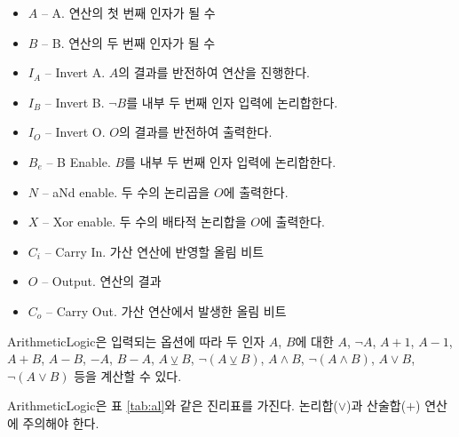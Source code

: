 \documentclass{article}
\renewcommand{\tablename}{표}
\begin{document}
\begin{itemize}
    \item $A$ -- A. 연산의 첫 번째 인자가 될 수
    \item $B$ -- B. 연산의 두 번째 인자가 될 수
    \item $I_A$ -- Invert A. $A$의 결과를 반전하여 연산을 진행한다.
    \item $I_B$ -- Invert B. $\neg B$를 내부 두 번째 인자 입력에 논리합한다.
    \item $I_O$ -- Invert O. $O$의 결과를 반전하여 출력한다.
    \item $B_e$ -- B Enable. $B$를 내부 두 번째 인자 입력에 논리합한다.
    \item $N$ -- aNd enable. 두 수의 논리곱을 $O$에 출력한다.
    \item $X$ -- Xor enable. 두 수의 배타적 논리합을 $O$에 출력한다.
    \item $C_i$ -- Carry In. 가산 연산에 반영할 올림 비트
    \item $O$ -- Output. 연산의 결과
    \item $C_o$ -- Carry Out. 가산 연산에서 발생한 올림 비트
\end{itemize}

ArithmeticLogic은 입력되는 옵션에 따라 두 인자 $A$, $B$에 대한
$A$, $\neg A$, $A+1$, $A-1$, $A+B$, $A-B$, $-A$, $B-A$,
$A \veebar B$, $\neg(A \veebar B)$, $A\wedge B$, $\neg (A \wedge B)$, $A \vee B$, $\neg(A \vee B)$ 등을
계산할 수 있다.

ArithmeticLogic은 \tablename{} \ref{tab:al}와 같은 진리표를 가진다.
논리합($\vee$)과 산술합($+$) 연산에 주의해야 한다.
\end{document}
